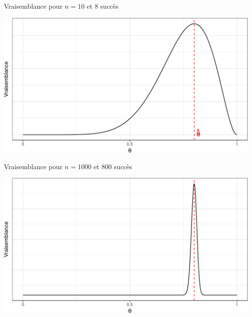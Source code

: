 \documentclass[9pt,ignorenonframetext,]{beamer}
\begin{document}
\begin{frame}{Vraisemblance pour \(n = 10\) et 8 succès}
\protect\hypertarget{vraisemblance-pour-n-10-et-8-succuxe8s}{}

\includegraphics{diapos_inference_bayesienne_files/figure-beamer/vraisemblance_10-1.pdf}

\end{frame}

\begin{frame}{Vraisemblance pour \(n = 1000\) et 800 succès}
\protect\hypertarget{vraisemblance-pour-n-1000-et-800-succuxe8s}{}

\includegraphics{diapos_inference_bayesienne_files/figure-beamer/vraisemblance_1000-1.pdf}

\end{frame}
\end{document}
